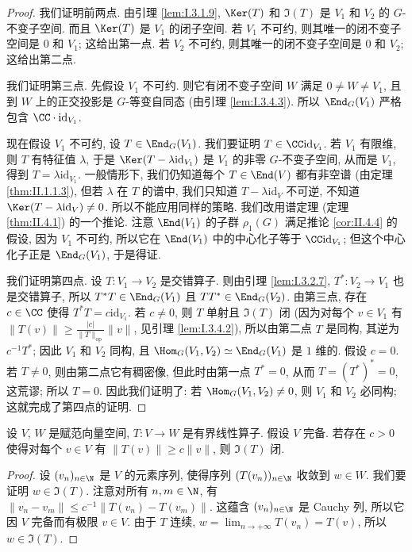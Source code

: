 \begin{proof}
我们证明前两点. 由引理 \ref{lem:I.3.1.9}, $\Ker(T)$ 和 $\Im(T)$ 是 $V_1$ 和 $V_2$ 的 $G$-不变子空间. 而且 $\Ker(T)$ 是 $V_1$ 的闭子空间. 若 $V_1$ 不可约, 则其唯一的闭不变子空间是 $0$ 和 $V_1$; 这给出第一点. 若 $V_2$ 不可约, 则其唯一的闭不变子空间是 $0$ 和 $V_2$; 这给出第二点.

我们证明第三点. 先假设 $V_1$ 不可约. 则它有闭不变子空间 $W$ 满足 $0 \neq W \neq V_1$, 且到 $W$ 上的正交投影是 $G$-等变自同态 (由引理 \ref{lem:I.3.4.3}). 所以 $\End_G(V_1)$ 严格包含 $\CC \cdot \mathrm{id}_{V_1}$.

现在假设 $V_1$ 不可约, 设 $T \in \End_G(V_1)$. 我们要证明 $T \in \CC\mathrm{id}_{V_1}$. 若 $V_1$ 有限维, 则 $T$ 有特征值 $\lambda$, 于是 $\Ker(T - \lambda\mathrm{id}_{V_1})$ 是 $V_1$ 的非零 $G$-不变子空间, 从而是 $V_1$, 得到 $T = \lambda\mathrm{id}_{V_1}$. 一般情形下, 我们仍知道每个 $T \in \End(V)$ 都有非空谱 (由定理 \ref{thm:II.1.1.3}), 但若 $\lambda$ 在 $T$ 的谱中, 我们只知道 $T - \lambda\mathrm{id}_V$ 不可逆, 不知道 $\Ker(T - \lambda\mathrm{id}_V) \neq 0$. 所以不能应用同样的策略. 我们改用谱定理 (定理 \ref{thm:II.4.1}) 的一个推论. 注意 $\End(V_1)$ 的子群 $\rho_1(G)$ 满足推论 \ref{cor:II.4.4} 的假设, 因为 $V_1$ 不可约, 所以它在 $\End(V_1)$ 中的中心化子等于 $\CC\mathrm{id}_{V_1}$; 但这个中心化子正是 $\End_G(V_1)$, 于是得证.

我们证明第四点. 设 $T \colon V_1 \to V_2$ 是交错算子. 则由引理 \ref{lem:I.3.2.7}, $T^* \colon V_2 \to V_1$ 也是交错算子, 所以 $T^*T \in \End_G(V_1)$ 且 $TT^* \in \End_G(V_2)$. 由第三点, 存在 $c \in \CC$ 使得 $T^*T = c\mathrm{id}_{V_1}$. 若 $c \neq 0$, 则 $T$ 单射且 $\Im(T)$ 闭 (因为对每个 $v \in V_1$ 有 $\|T(v)\| \geq \frac{|c|}{\|T\|_{\mathrm{op}}}\|v\|$, 见引理 \ref{lem:I.3.4.2}), 所以由第二点 $T$ 是同构, 其逆为 $c^{-1}T^*$; 因此 $V_1$ 和 $V_2$ 同构, 且 $\Hom_G(V_1, V_2) \simeq \End_G(V_1)$ 是 $1$ 维的. 假设 $c = 0$. 若 $T \neq 0$, 则由第二点它有稠密像, 但此时由第一点 $T^* = 0$, 从而 $T = (T^*)^* = 0$, 这荒谬; 所以 $T = 0$. 因此我们证明了: 若 $\Hom_G(V_1, V_2) \neq 0$, 则 $V_1$ 和 $V_2$ 必同构; 这就完成了第四点的证明.
\end{proof}

\begin{lemma}[压缩映射的闭像]
\label{lem:I.3.4.2}
设 $V$, $W$ 是赋范向量空间, $T \colon V \to W$ 是有界线性算子. 假设 $V$ 完备. 若存在 $c > 0$ 使得对每个 $v \in V$ 有 $\|T(v)\| \geq c\|v\|$, 则 $\Im(T)$ 闭.
\end{lemma}

\begin{proof}
设 $(v_n)_{n \in \N}$ 是 $V$ 的元素序列, 使得序列 $(T(v_n))_{n \in \N}$ 收敛到 $w \in W$. 我们要证明 $w \in \Im(T)$. 注意对所有 $n, m \in \N$, 有 $\|v_n - v_m\| \leq c^{-1}\|T(v_n) - T(v_m)\|$. 这蕴含 $(v_n)_{n \in \N}$ 是 Cauchy 列, 所以它因 $V$ 完备而有极限 $v \in V$. 由于 $T$ 连续, $w = \lim_{n \to +\infty} T(v_n) = T(v)$, 所以 $w \in \Im(T)$.
\end{proof}

